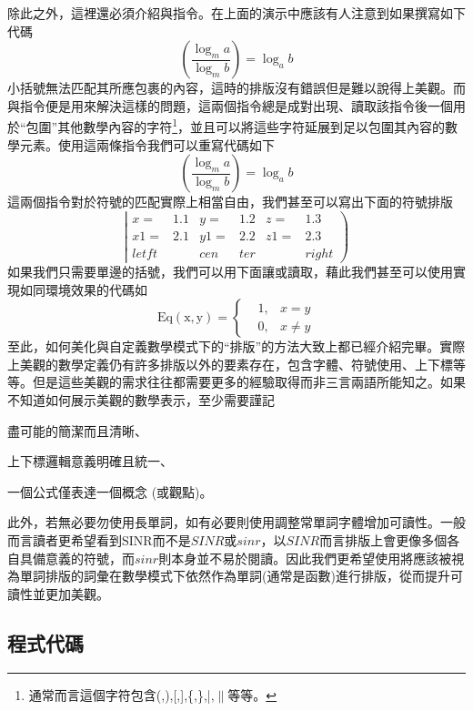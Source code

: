 \documentclass[12pt]{report}
\theoremstyle{plain}
\begin{document}
除此之外，這裡還必須介紹與指令。在上面的演示中應該有人注意到如果撰寫如下代碼
\[
(\frac{\log_m a}{\log_m b}) = \log_a b
\]
小括號無法匹配其所應包裹的內容，這時的排版沒有錯誤但是難以說得上美觀。而與指令便是用來解決這樣的問題，這兩個指令總是成對出現、讀取該指令後一個用於``包圍''其他數學內容的字符\footnote{通常而言這個字符包含(,),[,],\{,\},|,$\|$等等。}，並且可以將這些字符延展到足以包圍其內容的數學元素。使用這兩條指令我們可以重寫代碼如下
\[
\left(\frac{\log_m a}{\log_m b}\right) = \log_a b
\]
這兩個指令對於符號的匹配實際上相當自由，我們甚至可以寫出下面的符號排版
\begin{equation}
\left|
\begin{aligned}
    x=&1.1 & y=&1.2 & z=&1.3\\
    x1=&2.1 & y1=&2.2 & z1=&2.3\\
    letft& & cen&ter & &right
\end{aligned}
\right)
\end{equation}
如果我們只需要單邊的括號，我們可以用下面讓或讀取，藉此我們甚至可以使用實現如同環境效果的代碼如
\begin{equation}
\mathrm{Eq(x,y)} = 
\left\{
\begin{aligned}
    &1, &x=y\\
    &0, &x\neq y
\end{aligned}
\right.
\end{equation}
至此，如何美化與自定義數學模式下的``排版''的方法大致上都已經介紹完畢。實際上美觀的數學定義仍有許多排版以外的要素存在，包含字體、符號使用、上下標等等。但是這些美觀的需求往往都需要更多的經驗取得而非三言兩語所能知之。如果不知道如何展示美觀的數學表示，至少需要謹記
\begin{enumerate*}
    \item 盡可能的簡潔而且清晰、
    \item 上下標邏輯意義明確且統一、
    \item 一個公式僅表達一個概念 (或觀點)。
\end{enumerate*}
此外，若無必要勿使用長單詞，如有必要則使用調整常單詞字體增加可讀性。一般而言讀者更希望看到$\mathrm{SINR}$而不是$SINR$或$sinr$，以$SINR$而言排版上會更像多個各自具備意義的符號，而$sinr$則本身並不易於閱讀。因此我們更希望使用將應該被視為單詞排版的詞彙在數學模式下依然作為單詞(通常是函數)進行排版，從而提升可讀性並更加美觀。

\subsection{程式代碼}
\end{document}
